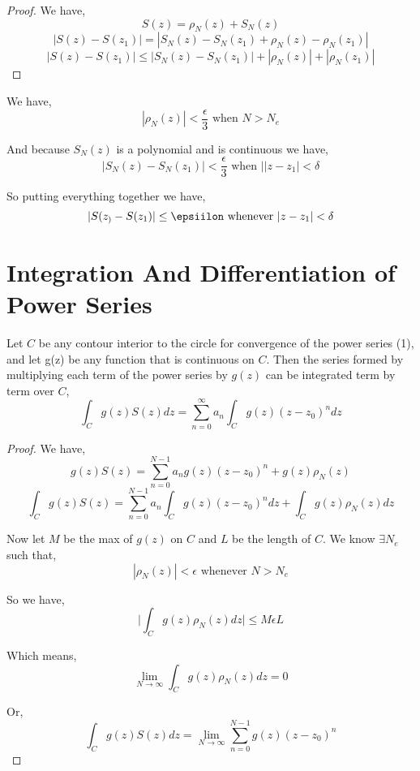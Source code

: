 \begin{proof}
   We have, 
   $$  S(z) =\rho_N(z) + S_N(z) $$ 
   $$ |S(z) - S(z_1)| = |S_N(z) - S_N(z_1) + \rho_N(z) - \rho_N(z_1)|$$ 
   $$ |S(z) - S(z_1)| \le |S_N(z) - S_N(z_1)| + |\rho_N(z)| + |\rho_N(z_1)|$$ 
\end{proof}

We have, 
$$ |\rho_N(z)| < \frac{\epsilon}{3}\text{ when } N > N_e $$ 

And because $S_N(z)$ is a polynomial and is continuous we have, 
$$ |S_N(z) - S_N(z_1)| < \frac{\epsilon}{3} \text { when } | |z- z_1 | < \delta$$ 

So putting everything together we have, 
$$ |S(z_) - S(z_1)| \le \epsiilon \text{ whenever } |z - z_1| < \delta $$ 



\section{Integration And Differentiation of Power Series}
\begin{theorem}
   Let $C$ be any contour interior to the circle for convergence of the power series (1), and let g(z) be any function that is continuous on $C$.  Then the series formed by multiplying each term of the power series by $g(z)$ can be integrated term by term over $C$,  
   $$ \int_C g(z) S(z) dz = \sum_{n=0}^{\infty} a_n \int_C g(z) (z - z_0)^{n}dz $$ 
\end{theorem}
\begin{proof}
   We have, 
   $$ g(z)S(z) = \sum_{n=0}^{N-1} a_ng(z)(z - z_0)^{n} + g(z) \rho_N(z) $$ 
   $$ \int_C g(z) S(z) =   \sum_{n=0}^{N-1} a_n \int_C g(z)(z - z_0)^{n}dz +\int_C g(z) \rho_N(z) dz$$ 

   Now let $M$ be the max of $g(z)$ on $C$ and $L$ be the length of $C$. We know $\exists N_e$ such that, 
   $$ |\rho_N(z)| < \epsilon \text{ whenever } N > N_e$$ 

   So we have, 
   $$\bigg|\int_C g(z) \rho_N(z) dz\bigg|  \le M\epsilon L$$ 

   Which means, 
   $$ \lim_{N \to \infty} \int_C g(z)\rho_N(z) dz = 0 $$ 

   Or, 
   $$ \int_C g(z) S(z) dz = \lim_{N \to \infty} \sum_{n=0}^{N-1} g(z) (z - z_0)^{n} $$ 
\end{proof}


